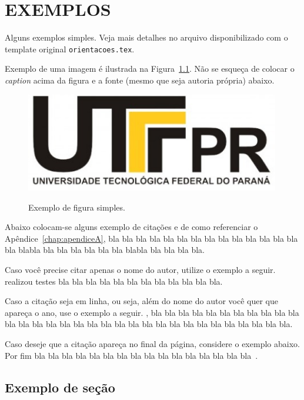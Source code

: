
\chapter{EXEMPLOS}
\label{chap:exemplos}

Alguns exemplos simples. Veja mais detalhes no arquivo disponibilizado com o template original \texttt{orientacoes.tex}.

Exemplo de uma imagem é ilustrada na Figura~\ref{fig:exemple01}. Não se esqueça de colocar o \textit{caption} acima da figura e a fonte (mesmo que seja autoria própria) abaixo.

\begin{figure}[!htb]
    \centering
    \caption{Exemplo de figura simples.}
    
    \includegraphics[width=0.99\textwidth]{./dados/figuras/teste.jpg}
    \label{fig:exemple01}
\end{figure}

Abaixo colocam-se alguns exemplo de citações e de como referenciar o Apêndice~\ref{chap:apendiceA},  bla bla bla bla bla bla bla bla bla bla bla bla bla bla bla blabla bla bla bla bla bla bla blabla bla bla bla bla.


Caso você precise citar apenas o nome do autor, utilize o exemplo a seguir. \citeauthor{Cormen2009} realizou testes bla bla bla bla bla bla bla bla bla bla bla bla.


Caso a citação seja em linha, ou seja, além do nome do autor você quer que apareça o ano, use o exemplo a seguir. , bla bla bla bla bla bla bla bla bla bla bla bla bla bla bla bla bla bla bla bla bla bla bla bla bla bla bla bla bla bla bla bla.

Caso deseje que a citação apareça no final da página, considere o exemplo abaixo. Por fim bla bla bla bla bla bla bla bla bla bla bla bla bla bla bla bla~\cite{Knuth1986}.

\section{Exemplo de seção}
\label{sec:exampleSection}

